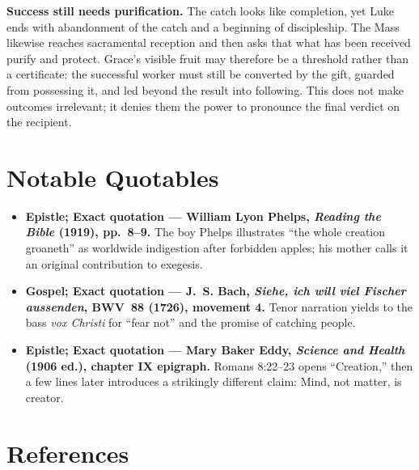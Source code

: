 \begin{deepstudy}
\noindent\textbf{Success still needs purification.\enspace{}}
The catch looks like completion, yet Luke ends with abandonment of the catch and a beginning of discipleship. The Mass likewise reaches sacramental reception and then asks that what has been received purify and protect. Grace's visible fruit may therefore be a threshold rather than a certificate: the successful worker must still be converted by the gift, guarded from possessing it, and led beyond the result into following. This does not make outcomes irrelevant; it denies them the power to pronounce the final verdict on the recipient.

\sectionguard
\section*{Notable Quotables}

{\small
\begin{itemize}[leftmargin=1.25em,itemsep=0.4em,topsep=0.15em,parsep=0pt]
\item \textbf{Epistle; Exact quotation --- William Lyon Phelps, \emph{Reading the Bible} (1919), pp.~8--9.} The boy Phelps illustrates “the whole creation groaneth” as worldwide indigestion after forbidden apples; his mother calls it an original contribution to exegesis.

\item \textbf{Gospel; Exact quotation --- J.~S. Bach, \emph{Siehe, ich will viel Fischer aussenden}, BWV~88 (1726), movement 4.} Tenor narration yields to the bass \emph{vox Christi} for “fear not” and the promise of catching people.

\item \textbf{Epistle; Exact quotation --- Mary Baker Eddy, \emph{Science and Health} (1906 ed.), chapter IX epigraph.} Romans 8:22--23 opens “Creation,” then a few lines later introduces a strikingly different claim: Mind, not matter, is creator.
\end{itemize}
}

\section*{References}


\end{deepstudy}
